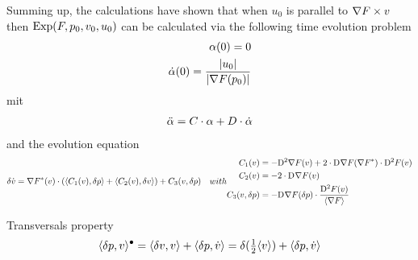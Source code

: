 Summing up, the calculations have shown
that when $ u_0 $ is parallel to $ \nabla F \times v $
then $ \operatorname{Exp}( F, p_0, v_0, u_0 ) $ can be calculated
via the following time evolution problem
\begin{align}
    \alpha( 0 )  =  0  \\
    \dot{ \alpha }( 0 )  =  \frac{ \lvert  u_0  \rvert }{ \lvert  \nabla F( p_0 )  \rvert }
\end{align}
mit
\begin{align}
    \ddot{ \alpha }   =
    C \cdot \alpha  +  D \cdot \dot{ \alpha }
\end{align}
and the evolution equation
\begin{subequations}
    \begin{align}
        \vardiff \dot{ v }   &=
        \darg{F}( v ) \mult
        (   \skap{ C_1( v ) }{ \vardiff p }  + 
            \skap{ C_2( v ) }{ \vardiff v }     )  +
        C_3( v, \vardiff p )
    \end{align}
    with
    \begin{align}
        C_1( v )  &=
        -\diff{2}{\grad{F}}( v )  +
        2 \mult \diff{}{\grad{F}}( \darg{F} ) \mult \diff{2}{F}( v )  \\
        C_2( v )  &=
        -2 \mult \diff{}{\grad{F}}( v )  \\
        C_3( v, \vardiff p )  &=
        - \diff{}{\grad{F}}( \vardiff p ) \mult \frac{ \diff{2}{F}(v ) }{ \skaq{ \grad{F} } }
    \end{align}
\end{subequations}



Transversals property
\begin{align}
    \langle  \delta p ,  v  \rangle^\bullet  =
    \langle  \delta v ,  v  \rangle  +  \langle  \delta p ,  \dot{ v }  \rangle  =
    \delta( \tfrac12 \langle  v  \rangle )  +  \langle  \delta p ,  \dot{ v }  \rangle
\end{align}